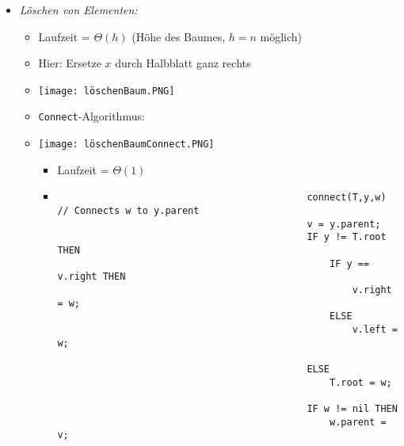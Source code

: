 \begin{itemize}
\begin{itemize}
                    \item \textit{Löschen von Elementen:}
                        \begin{itemize}
                            \item Laufzeit = $\Theta(h)$ (Höhe des Baumes, $h=n$ möglich)
                            \item Hier: Ersetze $x$ durch Halbblatt ganz rechts
                            \item[] \texttt{[image: löschenBaum.PNG]}
\pagebreak 
                            \item \texttt{Connect}-Algorithmus:
                            \item[]
                                \begin{minipage}[t]{0.35\textwidth}
                                    \texttt{[image: löschenBaumConnect.PNG]}
                                \end{minipage}
                                \begin{minipage}[t]{0.45\textwidth}
                                    \vspace{-7cm}
                                    \begin{itemize}
                                        \item Laufzeit = $\Theta(1)$
                                        \item[]
                                            \begin{verbatim}
                                            connect(T,y,w) // Connects w to y.parent
                                            v = y.parent;
                                            IF y != T.root THEN 
                                                IF y == v.right THEN 
                                                    v.right = w;
                                                ELSE 
                                                    v.left = w;
                                            
                                            ELSE 
                                                T.root = w;
                                            
                                            IF w != nil THEN 
                                                w.parent = v;
                                            \end{verbatim}
                                    \end{itemize}
                                \end{minipage}


\end{itemize}
\end{itemize}
\end{itemize}
